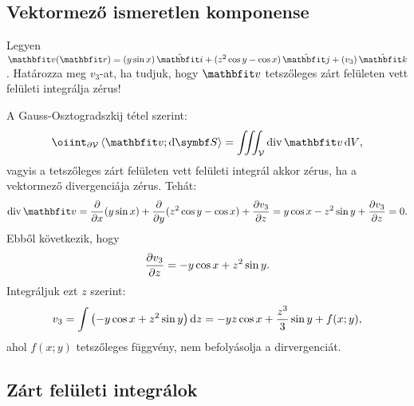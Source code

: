 \documentclass{szb-solution}
\begin{document}
\subsection{Vektormező ismeretlen komponense}

Legyen $\rvec v(\coordvec) = \ijk{y \sin x}{z^2 \cos y - \cos x}{v_3}$.
Határozza meg $v_3$-at, ha tudjuk, hogy $\rvec v$ tetszőleges zárt felületen
vett felületi integrálja zérus!

A Gauss-Osztogradszkij tétel szerint:
$$
  \oiint_{\partial \volimage} \scalar{\rvec v}{\dd \surfvec}
  =
  \iiint_{\volimage} \Div \rvec v \dd \volscalar
  \text,
$$
vagyis a tetszőleges zárt felületen vett felületi integrál akkor zérus, ha
a vektormező divergenciája zérus. Tehát:
$$
  \Div \rvec v
  = \pdv{}{x} (y \sin x) + \pdv{}{y} (z^2 \cos y - \cos x) + \pdv{v_3}{z}
  = y \cos x - z^2 \sin y + \pdv{v_3}{z}
  = 0
  \text.
$$
Ebből következik, hogy
$$
  \pdv{v_3}{z} = -y \cos x + z^2 \sin y
  \text.
$$
Integráljuk ezt $z$ szerint:
$$
  v_3 = \int \left( -y \cos x + z^2 \sin y \right) \mathop{}\!\mathrm{d} z
  = -y z \cos x + \frac{z^3}{3} \sin y + f(x; y)
  \text,
$$
ahol $f(x; y)$ tetszőleges függvény, nem befolyásolja a dirvergenciát.


\subsection{Zárt felületi integrálok}
\end{document}
